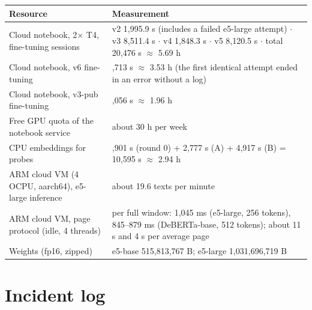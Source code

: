 \documentclass[11pt]{article}
\begin{document}
\begin{center}
\small
\begin{tabularx}{\linewidth}{@{}>{\raggedright\arraybackslash\hsize=0.73\hsize}X>{\raggedright\arraybackslash\hsize=1.27\hsize}X@{}}
\toprule
Resource & Measurement \\
\midrule
Cloud notebook, 2\ensuremath{\times} T4, fine-tuning sessions & v2 1,995.9 s (includes a failed e5-large attempt) \ensuremath{\cdot} v3 8,511.4 s \ensuremath{\cdot} v4 1,848.3 s \ensuremath{\cdot} v5 8,120.5 s \ensuremath{\cdot} total 20,476 s \ensuremath{\approx} 5.69 h %
 \\
Cloud notebook, v6 fine-tuning & 12,713 s \ensuremath{\approx} 3.53 h (the first identical attempt ended in an error without a log) %
 \\
Cloud notebook, v3-pub fine-tuning & 7,056 s \ensuremath{\approx} 1.96 h %
 \\
Free GPU quota of the notebook service & about 30 h per week %
 \\
CPU embeddings for probes & 2,901 s (round 0) + 2,777 s (A) + 4,917 s (B) = 10,595 s \ensuremath{\approx} 2.94 h %
 \\
ARM cloud VM (4 OCPU, aarch64), e5-large inference & about 19.6 texts per minute %
 \\
ARM cloud VM, page protocol (idle, 4 threads) & per full window: 1,045 ms (e5-large, 256 tokens), 845–879 ms (DeBERTa-base, 512 tokens); about 11 s and 4 s per average page %
 \\
Weights (fp16, zipped) & e5-base 515,813,767 B; e5-large 1,031,696,719 B %
 \\
\bottomrule
\end{tabularx}
\end{center}

\section{Incident log}\label{app:B}
\end{document}
